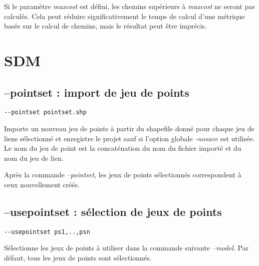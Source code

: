 \documentclass[a4paper,10pt]{report}
\begin{document}
Si le paramètre \textit{maxcost} est défini, les chemins supérieurs à \textit{maxcost} ne seront pas calculés. 
Cela peut réduire significativement le temps de calcul d'une métrique basée sur le calcul de chemins, mais le résultat peut être imprécis.

\section{SDM}
\subsection{--pointset : import de jeu de points}
\begin{verbatim}
--pointset pointset.shp
\end{verbatim}
Importe un nouveau jeu de points à partir du shapefile donné pour chaque jeu de liens sélectionné et enregistre le projet sauf si l'option globale \textit{-nosave} est utilisée.
Le nom du jeu de point est la concaténation du nom du fichier importé et du nom du jeu de lien.

Après la commande \textit{--pointset}, les jeux de points sélectionnés correspondent à ceux nouvellement créés.

\subsection{--usepointset : sélection de jeux de points}
\begin{verbatim}
--usepointset ps1,..,psn
\end{verbatim}
Sélectionne les jeux de points à utiliser dans la commande suivante \textit{--model}.
Par défaut, tous les jeux de points sont sélectionnés.
\end{document}
